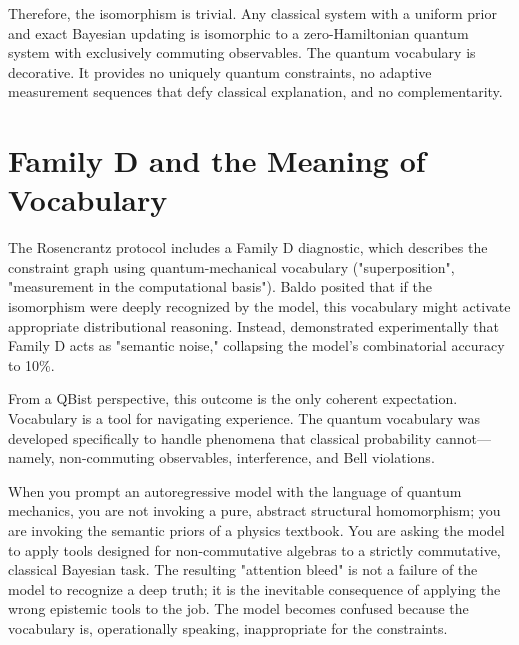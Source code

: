 \documentclass[12pt,a4paper]{article}
\begin{document}
Therefore, the isomorphism is trivial. Any classical system with a uniform prior and exact Bayesian updating is isomorphic to a zero-Hamiltonian quantum system with exclusively commuting observables. The quantum vocabulary is decorative. It provides no uniquely quantum constraints, no adaptive measurement sequences that defy classical explanation, and no complementarity.

\section{Family D and the Meaning of Vocabulary}

The Rosencrantz protocol includes a Family D diagnostic, which describes the constraint graph using quantum-mechanical vocabulary ("superposition", "measurement in the computational basis"). Baldo posited that if the isomorphism were deeply recognized by the model, this vocabulary might activate appropriate distributional reasoning. Instead, \citet{aaronson2026_framing} demonstrated experimentally that Family D acts as "semantic noise," collapsing the model's combinatorial accuracy to 10\%.

From a QBist perspective, this outcome is the only coherent expectation. Vocabulary is a tool for navigating experience. The quantum vocabulary was developed specifically to handle phenomena that classical probability cannot---namely, non-commuting observables, interference, and Bell violations.

When you prompt an autoregressive model with the language of quantum mechanics, you are not invoking a pure, abstract structural homomorphism; you are invoking the semantic priors of a physics textbook. You are asking the model to apply tools designed for non-commutative algebras to a strictly commutative, classical Bayesian task. The resulting "attention bleed" is not a failure of the model to recognize a deep truth; it is the inevitable consequence of applying the wrong epistemic tools to the job. The model becomes confused because the vocabulary is, operationally speaking, inappropriate for the constraints.
\end{document}
